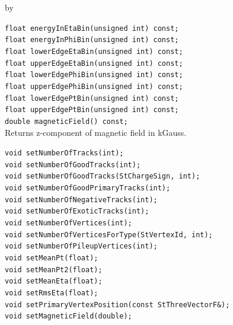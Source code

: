 \documentclass[twoside]{article}
\newcommand{\entrylabel}[1]{\mbox{\textbf{{#1}}}\hfil}%
\newenvironment{entry}
{\begin{list}{}%
    {\renewcommand{\makelabel}{\entrylabel}%
     \setlength{\labelwidth}{90pt}%
     \setlength{\leftmargin}{\labelwidth}
     \advance\leftmargin by \labelsep%
      }%
    }%
  {\end{list}}
\newcommand{\Entrylabel}[1]%
{\raisebox{0pt}[1ex][0pt]{\makebox[\labelwidth][l]%
    {\parbox[t]{\labelwidth}{\hspace{0pt}\textbf{{#1}}}}}}
\newenvironment{Entry}%
{\renewcommand{\entrylabel}{\Entrylabel}\begin{entry}}%
  {\end{entry}}
\begin{document}
\begin{Entry}
    \verb+float energyInEtaBin(unsigned int) const;+\\
    \verb+float energyInPhiBin(unsigned int) const;+\\
    \verb+float lowerEdgeEtaBin(unsigned int) const;+\\
    \verb+float upperEdgeEtaBin(unsigned int) const;+\\
    \verb+float lowerEdgePhiBin(unsigned int) const;+\\
    \verb+float upperEdgePhiBin(unsigned int) const;+\\
    \verb+float lowerEdgePtBin(unsigned int) const;+\\
    \verb+float upperEdgePtBin(unsigned int) const;+\\

    \verb+double magneticField() const;+\\
    Returns z-component of magnetic field in kGauss.
    
    \verb+void setNumberOfTracks(int);+\\
    \verb+void setNumberOfGoodTracks(int);+\\
    \verb+void setNumberOfGoodTracks(StChargeSign, int);+\\
    \verb+void setNumberOfGoodPrimaryTracks(int);+\\
    \verb+void setNumberOfNegativeTracks(int);+\\
    \verb+void setNumberOfExoticTracks(int);+\\
    \verb+void setNumberOfVertices(int);+\\
    \verb+void setNumberOfVerticesForType(StVertexId, int);+\\
    \verb+void setNumberOfPileupVertices(int);+\\
    \verb+void setMeanPt(float);+\\
    \verb+void setMeanPt2(float);+\\
    \verb+void setMeanEta(float);+\\
    \verb+void setRmsEta(float);+\\
    \verb+void setPrimaryVertexPosition(const StThreeVectorF&);+\\
    \verb+void setMagneticField(double);+\\
\end{Entry}
\clearpage
\end{document}

